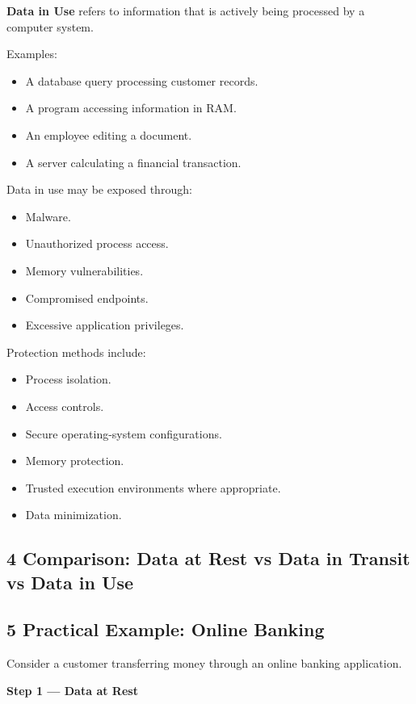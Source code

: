 \textbf{Data in Use} refers to information that is actively being processed by a computer system.

Examples:

\begin{itemize}
\item A database query processing customer records.
\item A program accessing information in RAM.
\item An employee editing a document.
\item A server calculating a financial transaction.
\end{itemize}

Data in use may be exposed through:

\begin{itemize}
\item Malware.
\item Unauthorized process access.
\item Memory vulnerabilities.
\item Compromised endpoints.
\item Excessive application privileges.
\end{itemize}

Protection methods include:

\begin{itemize}
\item Process isolation.
\item Access controls.
\item Secure operating-system configurations.
\item Memory protection.
\item Trusted execution environments where appropriate.
\item Data minimization.
\end{itemize}

\subsection{4 Comparison: Data at Rest vs Data in Transit vs Data in Use}


\subsection{5 Practical Example: Online Banking}

Consider a customer transferring money through an online banking application.

\textbf{Step 1 --- Data at Rest}

